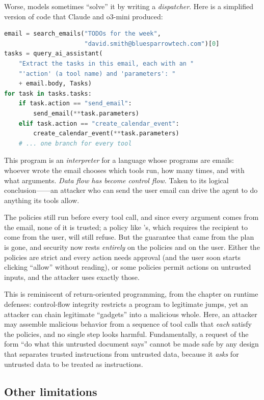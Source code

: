 Worse, models sometimes ``solve'' it by writing a \emph{dispatcher}.
Here is a simplified version of code that Claude and o3-mini produced:
\begin{lstlisting}[language=python,style=camel]
email = search_emails("TODOs for the week",
                      "david.smith@bluesparrowtech.com")[0]
tasks = query_ai_assistant(
    "Extract the tasks in this email, each with an "
    "'action' (a tool name) and 'parameters': "
    + email.body, Tasks)
for task in tasks.tasks:
    if task.action == "send_email":
        send_email(**task.parameters)
    elif task.action == "create_calendar_event":
        create_calendar_event(**task.parameters)
    # ... one branch for every tool
\end{lstlisting}
This program is an \emph{interpreter} for a language whose programs are
emails: whoever wrote the email chooses which tools run, how many times,
and with what arguments.
\emph{Data flow has become control flow.}
Taken to its logical conclusion------an attacker who can send the user email
can drive the agent to do anything its tools allow.

The policies still run before every tool call, and since every argument
comes from the email, none of it is trusted; a policy like
's, which requires the recipient to come from the user,
will still refuse.
But the guarantee that came from the plan is gone, and security now rests
\emph{entirely} on the policies and on the user.
Either the policies are strict and every action needs approval (and the
user soon starts clicking ``allow'' without reading), or some policies
permit actions on untrusted inputs, and the attacker uses exactly those.

This is reminiscent of return-oriented programming, from the chapter on
runtime defenses: control-flow integrity restricts a program to
legitimate jumps, yet an attacker can chain legitimate ``gadgets'' into a
malicious whole.
Here, an attacker may assemble malicious behavior from a sequence of tool
calls that \emph{each} satisfy the policies, and no single step looks
harmful.
Fundamentally, a request of the form ``do what this untrusted document
says'' cannot be made safe by any design that separates trusted
instructions from untrusted data, because it \emph{asks} for untrusted
data to be treated as instructions.

\subsection{Other limitations}

